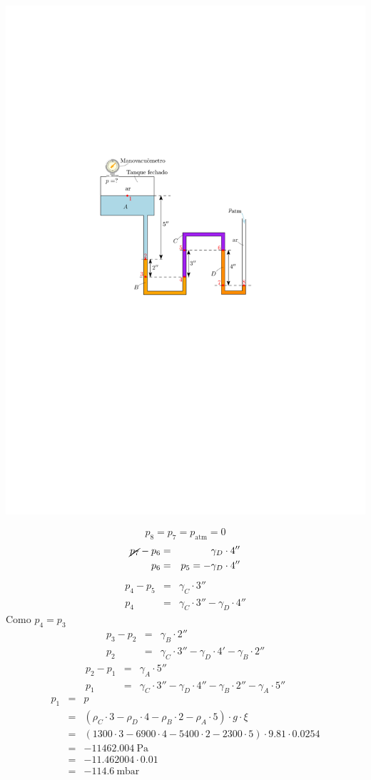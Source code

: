 \documentclass[
	a4paper,
	12pt,
	brazilian
]{article}
\begin{document}
	\begin{center}
		\includegraphics[width=.7\linewidth]{assets/images/pontos_5}
	\end{center}
	\begin{equation}
		p_{8}=p_{7}=p_{\textrm{atm}}=0
	\end{equation}
	\begin{eqnarray}
		\cancel{p_{7}}-p_{6}&=&\gamma_{D}\cdot 4''\\
		p_{6}&=&p_{5}=-\gamma_{D}\cdot 4''
	\end{eqnarray}
	\begin{eqnarray}
		p_{4}-p_{5}&=&\gamma_{C}\cdot 3''\\
		p_{4}&=&\gamma_{C}\cdot 3''-\gamma_{D}\cdot 4''
	\end{eqnarray}
	Como $p_{4}=p_{3}$
	\begin{eqnarray}
		p_{3}-p_{2}&=&\gamma_{B}\cdot 2''\\
		p_{2}&=&\gamma_{C}\cdot 3''-\gamma_{D}\cdot 4'-\gamma_{B}\cdot 2''
	\end{eqnarray}
	\begin{eqnarray}
		p_{2}-p_{1}&=&\gamma_{A}\cdot 5''\\
		p_{1}&=&\gamma_{C}\cdot 3''-\gamma_{D}\cdot 4''-\gamma_{B}\cdot 2''-\gamma_{A}\cdot 5''
	\end{eqnarray}
	\begin{eqnarray}
		p_{1}&=&p\\
		&=&(\rho_{C}\cdot 3-\rho_{D}\cdot 4-\rho_{B}\cdot 2-\rho_{A}\cdot 5)\cdot g\cdot\xi\\
		&=&(1300\cdot 3-6900\cdot 4-5400\cdot 2-2300\cdot 5)\cdot 9.81\cdot 0.0254\\
		&=&\SI{-11462.004}{\pascal}\\
		&=&-11.462004\cdot 0.01\\
		&=&\SI{-114.6}{\milli\bar}
	\end{eqnarray}
\end{document}
